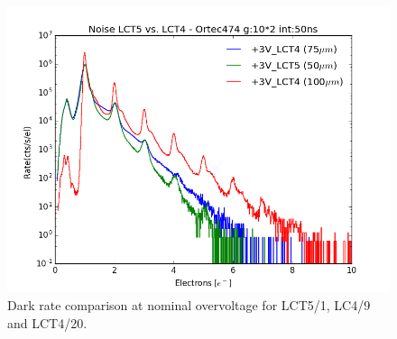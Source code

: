 \documentclass[10pt,a4paper, openany]{book}
\begin{document}
\begin{figure}[!h]
\begin{center}
\includegraphics[scale=0.6]{imm/noise_conf_lct.png}
\end{center}
\caption{Dark rate comparison at nominal overvoltage for LCT5/1, LC4/9 and LCT4/20.} 
\label{fig:noise+3}
\end{figure}
\end{document}
